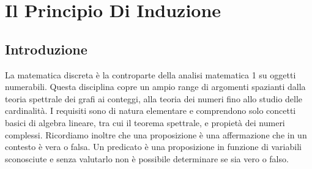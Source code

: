 \chapter{Il Principio Di Induzione}
\section{Introduzione}
La matematica discreta è la controparte della analisi matematica 1 su oggetti numerabili. Questa disciplina copre un ampio range di argomenti spazianti dalla teoria spettrale dei grafi ai conteggi, alla teoria dei numeri fino allo studio delle cardinalità. I requisiti sono di natura elementare e comprendono solo concetti basici di algebra lineare, tra cui il teorema spettrale, e propietà dei numeri complessi. Ricordiamo inoltre che una proposizione è una affermazione che in un contesto è vera o falsa. Un predicato è una proposizione in funzione di variabili sconosciute e senza valutarlo non è possibile determinare se sia vero o falso.
